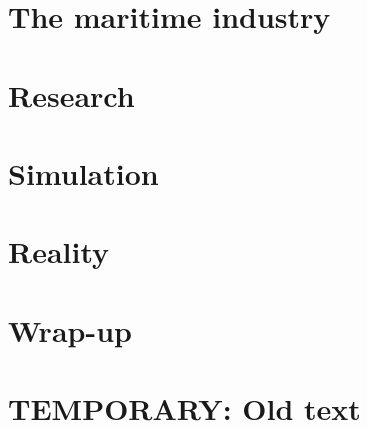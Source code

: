 \documentclass[a4paper,11pt,oneside]{book}
\begin{document}
\frontmatter


\makeCover %

\listoftodos[Notes]
\clearpage





\clearpage
\setcounter{tocdepth}{1}
\tableofcontents
\clearpage

\mainmatter



\part{The maritime industry}



\part{Research}




\part{Simulation}




\part{Reality}







\part{Wrap-up}




\backmatter

\part{TEMPORARY: Old text}







\end{document}
